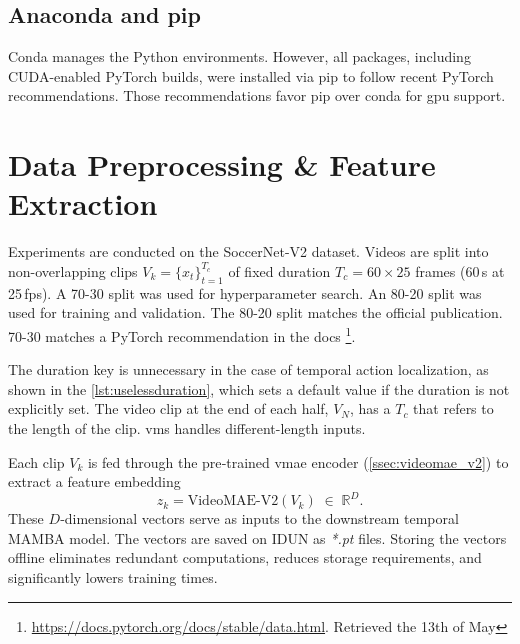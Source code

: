 \subsection{Anaconda and pip}
\label{ssec:conda_pip}
Conda manages the Python environments. However, all packages, including CUDA-enabled PyTorch builds, were installed via pip to follow recent PyTorch recommendations. Those recommendations favor pip over conda for \acrshort{gpu} support.

\section{Data Preprocessing \& Feature Extraction}
\label{sec:preprocessing}

Experiments are conducted on the SoccerNet-V2 dataset\cite{deliege_soccernet-v2_dataset_2021}. Videos are split into non-overlapping clips $V_k=\{x_t\}_{t=1}^{T_c}$ of fixed duration $T_c=60\!\times\!25$ frames (60\,s at 25\,fps). A 70-30 split was used for hyperparameter search. An 80-20 split was used for training and validation. The 80-20 split matches the official publication. 70-30 matches a PyTorch recommendation in the docs \footnote{\url{https://docs.pytorch.org/docs/stable/data.html}. Retrieved the 13th of May}.



The duration key is unnecessary in the case of temporal action localization, as shown in the \autoref{lst:uselessduration}, which sets a default value if the duration is not explicitly set. The video clip at the end of each half, $V_{N}$, has a $T_c$ that refers to the length of the clip. \acrfull{vms} handles different-length inputs. 



Each clip $V_k$ is fed through the pre‐trained \acrshort{vmae} encoder (\cref{ssec:videomae_v2}) to extract a feature embedding
\[
z_k = \mathrm{VideoMAE\text{-}V2}(V_k)\;\in\;\mathbb{R}^D.
\]
These $D$‐dimensional vectors serve as inputs to the downstream temporal MAMBA model. The vectors are saved on IDUN as \textit{*.pt} files. Storing the vectors offline eliminates redundant computations, reduces storage requirements, and significantly lowers training times. 

